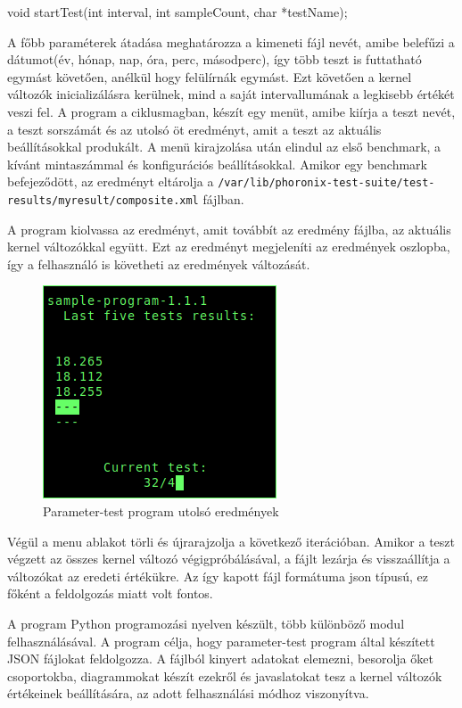 \begin{cpp}
void startTest(int interval, int sampleCount, char *testName);
\end{cpp}
A főbb paraméterek átadása meghatározza a kimeneti fájl nevét, amibe belefűzi a dátumot(év, hónap, nap, óra, perc, másodperc), így több teszt is futtatható egymást követően, anélkül hogy felülírnák egymást.
Ezt követően a kernel változók inicializálásra kerülnek, mind a saját intervallumának a legkisebb értékét veszi fel. A program a ciklusmagban, készít egy menüt, amibe kiírja a teszt nevét, a teszt sorszámát és az utolsó öt eredményt, amit a teszt az aktuális beállításokkal produkált. A menü kirajzolása után elindul az első benchmark, a kívánt mintaszámmal és konfigurációs beállításokkal. Amikor egy benchmark befejeződött, az eredményt eltárolja a \texttt{/var/lib/phoronix-test-suite/test-results/myresult/composite.xml} fájlban.

\noindent A program kiolvassa az eredményt, amit továbbít az eredmény fájlba, az aktuális kernel változókkal együtt. Ezt az eredményt megjeleníti az eredmények oszlopba, így a felhasználó is követheti az eredmények változását.

\begin{figure}[h!]
\centering
\includegraphics[scale=2.0]{images/parameter-test.png}
\caption{Parameter-test program utolsó eredmények}
\label{fig:parameter-test}
\end{figure}

Végül a menu ablakot törli és újrarajzolja a következő iterációban.
Amikor a teszt végzett az összes kernel változó végigpróbálásával, a fájlt lezárja és visszaállítja a változókat az eredeti értékükre.
Az így kapott fájl formátuma json típusú, ez főként a feldolgozás miatt volt fontos.


A program Python programozási nyelven készült, több különböző modul felhasználásával. 
A program célja, hogy parameter-test program által készített JSON fájlokat feldolgozza. A fájlból kinyert adatokat elemezni, besorolja őket csoportokba, diagrammokat készít ezekről és javaslatokat tesz a kernel változók értékeinek beállítására, az adott felhasználási módhoz viszonyítva.

